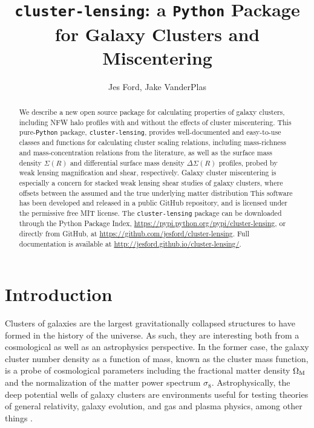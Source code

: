 \documentclass{emulateapj}
\begin{document}
\title{\MakeLowercase{\lstinline{cluster-lensing}}: a \lstinline{P}\MakeLowercase{\lstinline{ython}} Package for Galaxy Clusters and Miscentering}
\author{
Jes Ford,  
Jake VanderPlas
}



\begin{abstract}
We describe a new open source package for calculating properties of galaxy clusters, including NFW halo profiles with and without the effects of cluster miscentering. This pure-\lstinline{Python} package, \lstinline{cluster-lensing}, provides well-documented and easy-to-use classes and functions for calculating cluster scaling relations, including mass-richness and mass-concentration relations from the literature, as well as the surface mass density $\Sigma(R)$ and differential surface mass density $\Delta\Sigma(R)$ profiles, probed by weak lensing magnification and shear, respectively. Galaxy cluster miscentering is especially a concern for stacked weak lensing shear studies of galaxy clusters, where offsets between the assumed and the true underlying matter distribution
This software has been developed and released in a public GitHub repository, and is licensed under the permissive free MIT license. The \lstinline{cluster-lensing} package can be downloaded through the Python Package Index, \url{https://pypi.python.org/pypi/cluster-lensing}, or directly from GitHub, at \url{https://github.com/jesford/cluster-lensing}. Full documentation is available at \url{http://jesford.github.io/cluster-lensing/}.
\end{abstract}


\setcounter{section}{0}
\setcounter{subsection}{0}
\setcounter{subsubsection}{0}

\section{Introduction}
\label{intro}

Clusters of galaxies are the largest gravitationally collapsed structures to have formed in the history of the universe.  As such, they are interesting both from a cosmological as well as an astrophysics perspective. In the former case, the galaxy cluster number density as a function of mass, known as the cluster mass function, is a probe of cosmological parameters including the fractional matter density $\Omega_{\rm M}$ and the normalization of the matter power spectrum $\sigma_8$. Astrophysically, the deep potential wells of galaxy clusters are environments useful for testing theories of general relativity, galaxy evolution, and gas and plasma physics, among other things \citep{Voit05}. 
\end{document}
